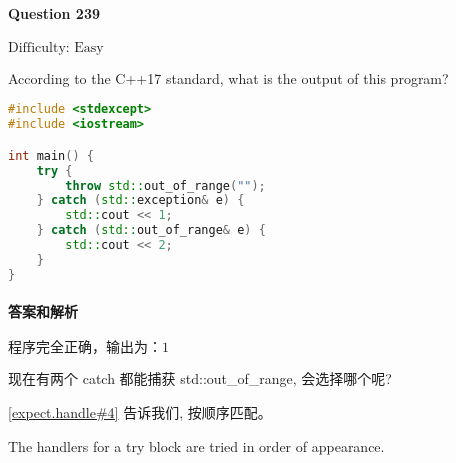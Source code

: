 \documentclass{article}
\begin{document}
	\paragraph*{Question 239}\noindent $\boxed{\text{Difficulty: Easy}} $
	
	According to the C++17 standard, what is the output of this program? 
	
	\begin{lstlisting}[language=C++]    
#include <stdexcept>
#include <iostream>

int main() {
	try {
		throw std::out_of_range("");
	} catch (std::exception& e) {
		std::cout << 1;
	} catch (std::out_of_range& e) {
		std::cout << 2;
	}
}
	\end{lstlisting}
	
	\paragraph*{答案和解析} $\boxed{\text{程序完全正确，输出为：1}} $
	
	现在有两个 catch 都能捕获 std::out\_of\_range, 会选择哪个呢?
	
	\href{https://timsong-cpp.github.io/cppwp/n4659/except.handle#4}{[expect.handle\#4]} 告诉我们, 按顺序匹配。
	
	\begin{lightgrayleftbar}
		The handlers for a try block are tried in order of appearance.
	\end{lightgrayleftbar}
\end{document}
